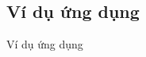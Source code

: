\documentclass{beamer}
\numberwithin{equation}{section}
\begin{document}
\subsection{Ví dụ ứng dụng}
\begin{frame}{Ví dụ ứng dụng}



\end{frame}





\end{document}

